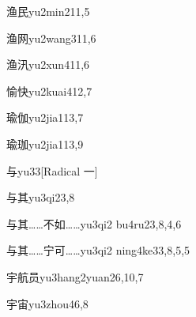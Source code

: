 \begin{entry}{渔民}{yu2min2}{11,5}
\end{entry}

\begin{entry}{渔网}{yu2wang3}{11,6}
\end{entry}

\begin{entry}{渔汛}{yu2xun4}{11,6}
\end{entry}

\begin{entry}{愉快}{yu2kuai4}{12,7}
\end{entry}

\begin{entry}{瑜伽}{yu2jia1}{13,7}
\end{entry}

\begin{entry}{瑜珈}{yu2jia1}{13,9}
\end{entry}

\begin{entry}{与}{yu3}{3}[Radical 一]
\end{entry}

\begin{entry}{与其}{yu3qi2}{3,8}
\end{entry}

\begin{entry}{与其……不如……}{yu3qi2 bu4ru2}{3,8,4,6}
\end{entry}

\begin{entry}{与其……宁可……}{yu3qi2 ning4ke3}{3,8,5,5}
\end{entry}

\begin{entry}{宇航员}{yu3hang2yuan2}{6,10,7}
\end{entry}

\begin{entry}{宇宙}{yu3zhou4}{6,8}
\end{entry}

